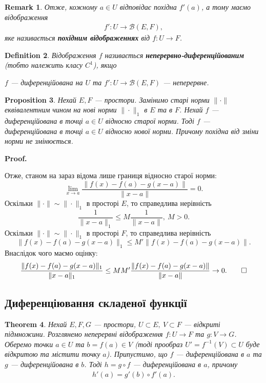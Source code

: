 \documentclass[a4paper, 10pt]{article}
\makeatletter
\theoremstyle{theoremdd}
\newtheorem{theorem}{Theorem}[subsection]
\theoremstyle{theoremdd}
\newtheorem{definition}[theorem]{Definition}
\theoremstyle{theoremdd}
\theoremstyle{theoremdd}
\theoremstyle{theoremdd}
\newtheorem{proposition}[theorem]{Proposition}
\theoremstyle{theoremdd}
\newtheorem{remark}[theorem]{Remark}
\theoremstyle{theoremdd}
\theoremstyle{theoremdd}
\renewenvironment{proof}[1][Proof.\\]{\par
\pushQED{\hfill \qed}%
\normalfont \topsep6\p@\@plus6\p@\relax
\trivlist
\item\relax
{\bfseries
#1\@addpunct{.}}\hspace\labelsep\ignorespaces
}{%
\popQED\endtrivlist\@endpefalse
}
\makeatother
\begin{document}
\begin{remark}
Отже, кожному $a \in U$ відповідає похідна $f'(a)$, а тому маємо відображення
\begin{align*}
f' \colon U \to \mathcal{B}(E,F),
\end{align*}
яке називається \textbf{похідним відображеннях} від $f \colon U \to F$.
\end{remark}

\begin{definition}
Відображення $f$ називається \textbf{неперервно-диференційованим} (\textit{тобто належить класу $C^1$}), якщо
\begin{center}
$f$ --- диференційована на $U$ та $f' \colon U \to \mathcal{B}(E,F)$ --- неперервне. 
\end{center}
\end{definition}

\begin{proposition}
Нехай $E,F$ --- простори. Замінимо старі норми $\| \cdot \|$ еквівалентним чином на нові норми $\| \cdot \|_1$ в $E$ та в $F$.
Нехай $f$ --- диференційована в точці $a \in U$ відносно старої норми. Тоді $f$ --- диференційована в точці $a \in U$ відносно нової норми. Причому похідна від зміни норми не змінюється.
\end{proposition}

\begin{proof}
Отже, станом на зараз відома лише границя відносно старої норми:
\[
\lim_{x \to a} \dfrac{\|f(x) - f(a) - g(x-a)\|}{\|x-a\|} = 0.
\]
Оскільки $\| \cdot \| \sim \| \cdot \|_1$ в просторі $E$, то справедлива нерівність
\[
\dfrac{1}{\|x-a\|_1} \leq M \dfrac{1}{\|x-a\|},\ M > 0.
\]
Оскільки $\| \cdot \| \sim \| \cdot \|_1$ в просторі $F$, то справедлива нерівність
\[
\|f(x) - f(a) - g(x-a)\|_1 \leq M' \|f(x) - f(a) - g(x-a)\|.
\]
Внаслідок чого маємо оцінку:
\[
\dfrac{\|f(x) - f(a) - g(x-a)\|_1}{\|x-a\|_1} \leq MM' \dfrac{\|f(x) - f(a) - g(x-a)\|}{\|x-a\|} \to 0. \qedhere
\]
\end{proof}

\subsection{Диференціювання складеної функції}
\begin{theorem}
Нехай $E,F,G$ --- простори, $U \subset E,\ V \subset F$ --- відкриті підмножини. Розглянемо неперервні відображення $f \colon U \to F$ та $g \colon V \to G$. Оберемо точки $a \in U$ та $b = f(a) \in V$ (\textit{тоді прообраз $U' = f^{-1}(V) \subset U$ буде відкритою та містити точку $a$}). Припустимо, що $f$ --- диференційована в $a$ та $g$ --- диференційована в $b$. Тоді $h = g \circ f$ --- диференційована в $a$, причому
\begin{align*}
h'(a) = g'(b) \circ f'(a).
\end{align*}
\end{theorem}
\end{document}
